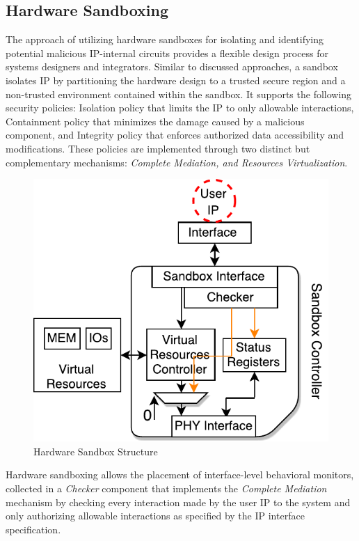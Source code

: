 \documentclass[sigconf]{acmart}
\theoremstyle{plain}
\theoremstyle{remark}
\begin{document}
\subsection{Hardware Sandboxing}\label{sec:HardwareSandbox}
The approach of utilizing hardware sandboxes for isolating and identifying potential malicious IP-internal circuits provides a flexible design process for systems designers and integrators. Similar to discussed approaches, a sandbox isolates IP by partitioning the hardware design to a trusted secure region and a non-trusted environment contained within the sandbox. It supports the following security policies: Isolation policy that limits the IP to only allowable interactions, Containment policy that minimizes the damage caused by a malicious component, and Integrity policy that enforces authorized data accessibility and modifications. These policies are implemented through two distinct but complementary mechanisms: \textit{ Complete Mediation, and  Resources Virtualization}.

\begin{figure}[hbt]
\centering
\includegraphics[width=0.75\columnwidth]{figures/sandbox.pdf}
\caption{Hardware Sandbox Structure} %
\label{fig:sandbox}
\end{figure}

Hardware sandboxing allows the placement of interface-level behavioral monitors, collected in a \textit{Checker} component that implements the \textit{Complete Mediation} mechanism by checking every interaction made by the user IP to the system and only authorizing allowable interactions as specified by the IP interface specification.
\end{document}

